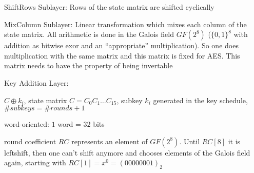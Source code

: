 \documentclass[landscape, a4paper]{article}
\begin{document}
\begin{minipage}[t]{0.198\pagewidth}
\begin{betterlist}
\begin{betterlist}
			\begin{betterlist}
				\item \alert{ShiftRows Sublayer:} Rows of the state matrix are shifted cyclically
				\item \alert{MixColumn Sublayer:} Linear transformation which mixes each column of the state matrix. All arithmetic is done in the Galois field $GF(2^8)$ ($\{0, 1\}^8$ with addition as bitwise exor and an \enquote{appropriate} multiplication). So one does multiplication with the same matrix and this matrix is fixed for AES. This matrix needs to have the property of being \alert{invertable}
			\end{betterlist}
			\item \alert{Key Addition Layer:}
			\begin{betterlist}
				\item $C \oplus k_i$, state matrix $C = C_0C_1\ldots C_{15}$, \alert{subkey} $k_i$ generated in the \alert{key schedule}, $\#subkeys = \#rounds + 1$
				\item \alert{word-oriented:} $1$ word = $32$ bits
				\item \alert{round coefficient} $RC$ represents an element of $GF(2^8)$. Until $RC[8]$ it is leftshift, then one can't shift anymore and chooses elements of the Galois field again, starting with $RC[1] = x^0 = (00000001)_2$
			\end{betterlist}
		\end{betterlist}
	\end{betterlist}
\end{minipage}

\newpage
\end{document}
